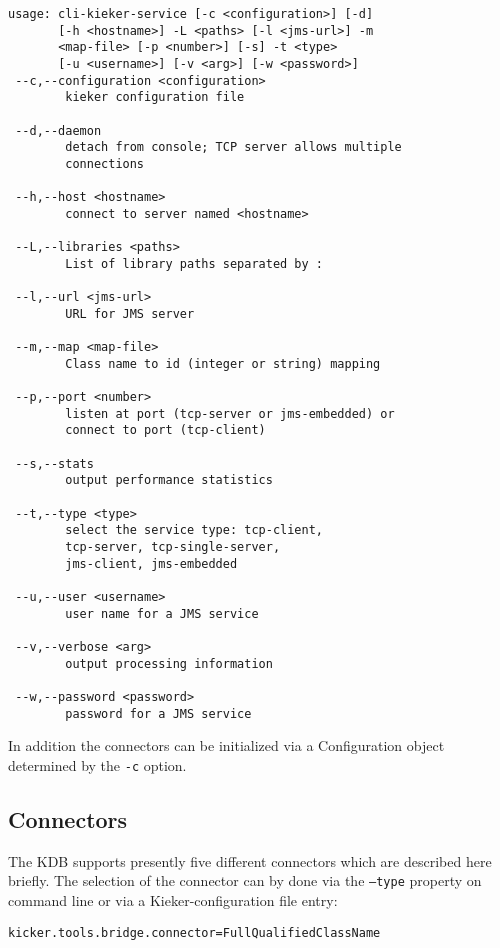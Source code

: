 \documentclass[11pt,a4paper]{article}
\begin{document}
\begin{lstlisting}[caption=Command line options of the Kieker Data Bridge]
usage: cli-kieker-service [-c <configuration>] [-d] 
       [-h <hostname>] -L <paths> [-l <jms-url>] -m
       <map-file> [-p <number>] [-s] -t <type>
       [-u <username>] [-v <arg>] [-w <password>]
 --c,--configuration <configuration>
        kieker configuration file

 --d,--daemon
        detach from console; TCP server allows multiple 
        connections

 --h,--host <hostname>
        connect to server named <hostname>

 --L,--libraries <paths>
        List of library paths separated by :

 --l,--url <jms-url>
        URL for JMS server

 --m,--map <map-file>
        Class name to id (integer or string) mapping

 --p,--port <number>
        listen at port (tcp-server or jms-embedded) or
        connect to port (tcp-client)

 --s,--stats
        output performance statistics

 --t,--type <type>
        select the service type: tcp-client,
        tcp-server, tcp-single-server, 
        jms-client, jms-embedded

 --u,--user <username>
        user name for a JMS service

 --v,--verbose <arg>
        output processing information

 --w,--password <password>
        password for a JMS service
\end{lstlisting}

\noindent
In addition the connectors can be initialized via a Configuration object determined by the \texttt{-c} option.

%
\subsection{Connectors}

The KDB supports presently five different connectors which are described here briefly. The selection of the connector can by done via the \texttt{--type} property on command line or via a Kieker-configuration file entry:

\begin{verbatim}
kicker.tools.bridge.connector=FullQualifiedClassName
\end{verbatim}
\end{document}
